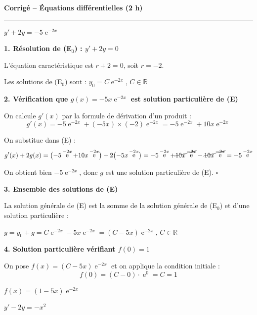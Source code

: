 \documentclass[11pt,a4paper]{article}
\DeclareMathOperator{\e}{e}
\newcommand{\reponse}[1]{%
  \begin{tcolorbox}[colback=blue!5!white, colframe=blue!50!black,
    boxrule=0.5pt, left=4pt, right=4pt, top=2pt, bottom=2pt]
  #1
  \end{tcolorbox}%
}
\begin{document}
\bigskip
\begin{center}
  \LARGE\textbf{Corrigé – Équations différentielles (2 h)}\\[0.3cm]
\end{center}
\normalsize
\hrule
\vspace{0.3cm}

 \quad
$y' + 2y = -5\e^{-2x}$

\medskip

\textbf{1. Résolution de (E$_0$) : $y' + 2y = 0$}

L'équation caractéristique est $r + 2 = 0$, soit $r = -2$.

\reponse{Les solutions de (E$_0$) sont : $y_0 = C\e^{-2x}$, \quad $C \in \mathbb{R}$}

\bigskip

\textbf{2. Vérification que $g(x) = -5x\e^{-2x}$ est solution particulière de (E)}

On calcule $g'(x)$ par la formule de dérivation d'un produit :
\[
  g'(x) = -5\e^{-2x} + (-5x)\times(-2)\e^{-2x} = -5\e^{-2x} + 10x\e^{-2x}
\]

On substitue dans (E) :
\[
  g'(x) + 2g(x) = \bigl(-5\e^{-2x} + 10x\e^{-2x}\bigr) + 2\bigl(-5x\e^{-2x}\bigr)
  = -5\e^{-2x} + \cancel{10x\e^{-2x}} - \cancel{10x\e^{-2x}}
  = -5\e^{-2x}
\]

On obtient bien $-5\e^{-2x}$, donc $g$ est une solution particulière de (E). \hfill $\square$

\bigskip

\textbf{3. Ensemble des solutions de (E)}

La solution générale de (E) est la somme de la solution générale de (E$_0$) et d'une solution particulière :

\reponse{$y = y_0 + g = C\e^{-2x} - 5x\e^{-2x} = (C - 5x)\e^{-2x}$, \quad $C \in \mathbb{R}$}

\bigskip

\textbf{4. Solution particulière vérifiant $f(0) = 1$}

On pose $f(x) = (C - 5x)\e^{-2x}$ et on applique la condition initiale :
\[
  f(0) = (C - 0)\cdot\e^{0} = C = 1
\]

\reponse{$f(x) = (1 - 5x)\e^{-2x}$}

\newpage

 \quad
$y' - 2y = -x^{2}$
\end{document}
